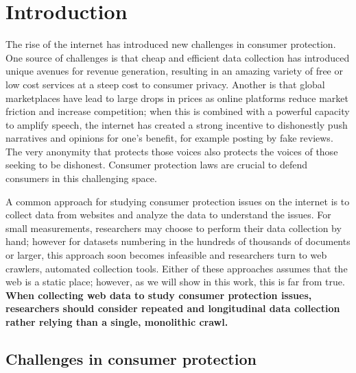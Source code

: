 \chapter{Introduction} \label{ch:introduction}


The rise of the internet has introduced new challenges in consumer protection. One source of challenges is that cheap and efficient data collection has introduced unique avenues for revenue generation, resulting in an amazing variety of free or low cost services at a steep cost to consumer privacy. Another is that global marketplaces have lead to large drops in prices as online platforms reduce market friction and increase competition; when this is combined with a powerful capacity to amplify speech, the internet has created a strong incentive to dishonestly push narratives and opinions for one's benefit, for example posting by fake reviews. The very anonymity that protects those voices also protects the voices of those seeking to be dishonest. Consumer protection laws are crucial to defend consumers in this challenging space.



A common approach for studying consumer protection issues on the internet is to collect data from websites and analyze the data to understand the issues. For small measurements, researchers may choose to perform their data collection by hand; however for datasets numbering in the hundreds of thousands of documents or larger, this approach soon becomes infeasible and researchers turn to web crawlers, automated collection tools. Either of these approaches assumes that the web is a static place; however, as we will show in this work, this is far from true. \textbf{When collecting web data to study consumer protection issues, researchers should consider repeated and longitudinal data collection rather relying than a single, monolithic crawl.}



\section{Challenges in consumer protection}

